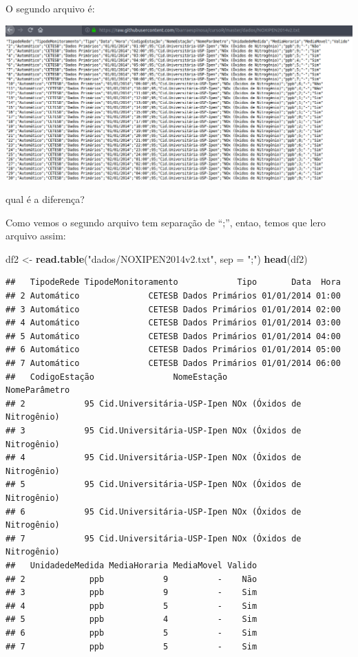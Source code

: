 \documentclass[]{book}
\newenvironment{Shaded}{\begin{snugshade}}{\end{snugshade}}
\newcommand{\KeywordTok}[1]{\textcolor[rgb]{0.13,0.29,0.53}{\textbf{#1}}}
\newcommand{\DataTypeTok}[1]{\textcolor[rgb]{0.13,0.29,0.53}{#1}}
\newcommand{\StringTok}[1]{\textcolor[rgb]{0.31,0.60,0.02}{#1}}
\newcommand{\NormalTok}[1]{#1}
\theoremstyle{definition}
\theoremstyle{definition}
\theoremstyle{definition}
\theoremstyle{remark}
\begin{document}
O segundo arquivo é:

\includegraphics[width=15.33in]{figuras/f2}

qual é a diferença?

Como vemos o segundo arquivo tem separação de ``;'', entao, temos que
lero arquivo assim:

\begin{Shaded}
\begin{Highlighting}[]
\NormalTok{df2 <-}\StringTok{ }\KeywordTok{read.table}\NormalTok{(}\StringTok{"dados/NOXIPEN2014v2.txt"}\NormalTok{, }\DataTypeTok{sep =} \StringTok{";"}\NormalTok{)}
\KeywordTok{head}\NormalTok{(df2)}
\end{Highlighting}
\end{Shaded}

\begin{verbatim}
##   TipodeRede TipodeMonitoramento            Tipo       Data  Hora
## 2 Automático              CETESB Dados Primários 01/01/2014 01:00
## 3 Automático              CETESB Dados Primários 01/01/2014 02:00
## 4 Automático              CETESB Dados Primários 01/01/2014 03:00
## 5 Automático              CETESB Dados Primários 01/01/2014 04:00
## 6 Automático              CETESB Dados Primários 01/01/2014 05:00
## 7 Automático              CETESB Dados Primários 01/01/2014 06:00
##   CodigoEstação                NomeEstação              NomeParâmetro
## 2            95 Cid.Universitária-USP-Ipen NOx (Óxidos de Nitrogênio)
## 3            95 Cid.Universitária-USP-Ipen NOx (Óxidos de Nitrogênio)
## 4            95 Cid.Universitária-USP-Ipen NOx (Óxidos de Nitrogênio)
## 5            95 Cid.Universitária-USP-Ipen NOx (Óxidos de Nitrogênio)
## 6            95 Cid.Universitária-USP-Ipen NOx (Óxidos de Nitrogênio)
## 7            95 Cid.Universitária-USP-Ipen NOx (Óxidos de Nitrogênio)
##   UnidadedeMedida MediaHoraria MediaMovel Valido
## 2             ppb            9          -    Não
## 3             ppb            9          -    Sim
## 4             ppb            5          -    Sim
## 5             ppb            4          -    Sim
## 6             ppb            5          -    Sim
## 7             ppb            5          -    Sim
\end{verbatim}
\end{document}
